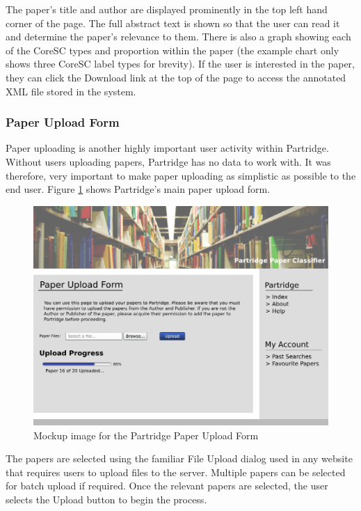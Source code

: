 The paper's title and author are displayed prominently in the top left hand
corner of the page. The full abstract text is shown so that the user can read
it and determine the paper's relevance to them. There is also a graph showing
each of the CoreSC types and proportion within the paper (the example chart only
shows three CoreSC label types for brevity). If the user is
interested in the paper, they can click the Download link at the top of the
page to access the annotated XML file stored in the system.

\subsubsection{Paper Upload Form}
Paper uploading is another highly important user activity within Partridge.
Without users uploading papers, Partridge has no data to work with. It was
therefore, very important to make paper uploading as simplistic as possible to
the end user. Figure \ref{fig:paper_upload} shows Partridge's main paper upload
form. 

\begin{figure}[!htb]
\vspace{5mm}
\centering
\includegraphics[width=\textwidth]{images/design/upload_mockup.png}
\caption{Mockup image for the Partridge Paper Upload Form}
\label{fig:paper_upload}
\end{figure}

The papers are selected using the familiar File Upload dialog used in any
website that requires users to upload files to the server. Multiple papers can
be selected for batch upload if required. Once the relevant papers are
selected, the user selects the Upload button to begin the process. 

